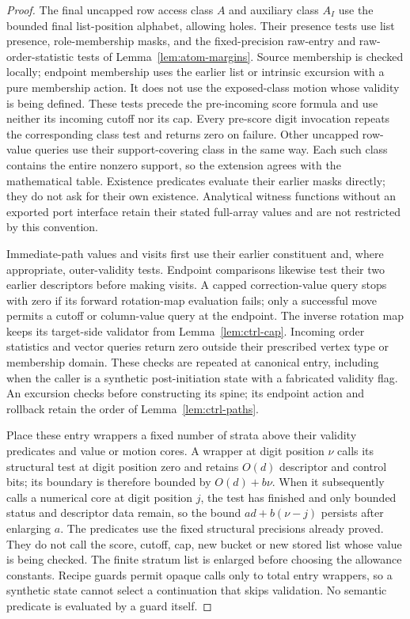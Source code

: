 \begin{proof}
The final uncapped row access class $A$ and auxiliary class $A_I$ use the bounded final
list-position alphabet, allowing holes. Their presence tests use list
presence, role-membership masks, and the fixed-precision raw-entry and
raw-order-statistic tests of Lemma~\ref{lem:atom-margins}. Source membership is
checked locally; endpoint membership uses the earlier list or intrinsic
excursion with a pure membership action. It does not use the exposed-class
motion whose validity is being defined. These tests precede the
pre-incoming score formula and use neither its incoming cutoff nor its
cap. Every pre-score digit invocation repeats the corresponding class
test and returns zero on failure. Other uncapped row-value queries use
their support-covering class in the same way. Each such class contains
the entire nonzero support, so the extension agrees with the mathematical
table. Existence predicates evaluate their earlier masks directly;
they do not ask for their own existence. Analytical witness functions
without an exported port interface retain their stated full-array
values and are not restricted by this convention.

Immediate-path values and visits first use their earlier constituent
and, where appropriate, outer-validity tests. Endpoint comparisons
likewise test their two earlier descriptors before making visits.
A capped correction-value query stops with zero if its forward rotation-map
evaluation fails; only a successful move permits a cutoff or column-value query
at the endpoint. The inverse rotation map keeps its target-side validator
from Lemma~\ref{lem:ctrl-cap}. Incoming order statistics and vector queries return
zero outside their prescribed vertex type or membership domain. These
checks are repeated at canonical entry, including when the caller is a
synthetic post-initiation state with a fabricated validity flag.
An excursion checks before constructing its spine; its endpoint action
and rollback retain the order of Lemma~\ref{lem:ctrl-paths}.

Place these entry wrappers a fixed number of strata above their
validity predicates and value or motion cores. A wrapper at digit position $\nu$
calls its structural test at digit position zero and retains $O(d)$ descriptor
and control bits; its boundary is therefore bounded by $O(d)+b\nu$.
When it subsequently calls a numerical core at digit position $j$, the test has
finished and only bounded status and descriptor data remain, so the
bound $ad+b(\nu-j)$ persists after enlarging $a$. The predicates use the
fixed structural precisions already proved. They do not call the score,
cutoff, cap, new bucket or new stored list whose value is being checked.
The finite stratum list is enlarged before choosing the allowance
constants. Recipe guards permit opaque calls only to total entry
wrappers, so a synthetic state cannot select a continuation that skips
validation. No semantic predicate is evaluated by a guard itself.


\end{proof}
